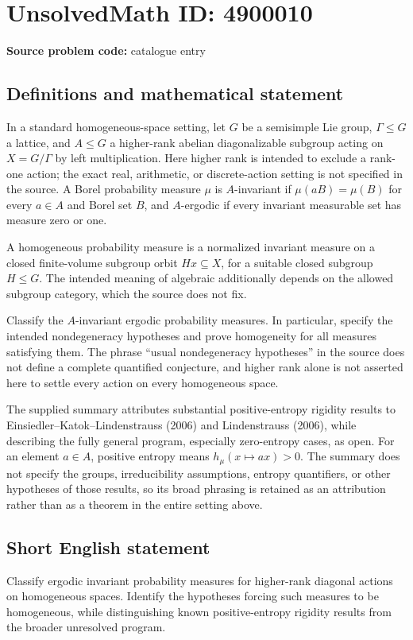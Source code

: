 \documentclass[11pt]{article}
\begin{document}
\section*{UnsolvedMath ID: 4900010}
\textbf{Source problem code:} catalogue entry
\subsection{Definitions and mathematical statement}
In a standard homogeneous-space setting, let $G$ be a semisimple Lie group, $\Gamma\leq G$ a lattice, and $A\leq G$ a higher-rank abelian diagonalizable subgroup acting on $X=G/\Gamma$ by left multiplication. Here higher rank is intended to exclude a rank-one action; the exact real, arithmetic, or discrete-action setting is not specified in the source. A Borel probability measure $\mu$ is $A$-invariant if $\mu(aB)=\mu(B)$ for every $a\in A$ and Borel set $B$, and $A$-ergodic if every invariant measurable set has measure zero or one.

A homogeneous probability measure is a normalized invariant measure on a closed finite-volume subgroup orbit $Hx\subseteq X$, for a suitable closed subgroup $H\leq G$. The intended meaning of algebraic additionally depends on the allowed subgroup category, which the source does not fix.

Classify the $A$-invariant ergodic probability measures. In particular, specify the intended nondegeneracy hypotheses and prove homogeneity for all measures satisfying them. The phrase ``usual nondegeneracy hypotheses'' in the source does not define a complete quantified conjecture, and higher rank alone is not asserted here to settle every action on every homogeneous space.

The supplied summary attributes substantial positive-entropy rigidity results to Einsiedler--Katok--Lindenstrauss (2006) and Lindenstrauss (2006), while describing the fully general program, especially zero-entropy cases, as open. For an element $a\in A$, positive entropy means $h_\mu(x\mapsto ax)>0$. The summary does not specify the groups, irreducibility assumptions, entropy quantifiers, or other hypotheses of those results, so its broad phrasing is retained as an attribution rather than as a theorem in the entire setting above.
\subsection{Short English statement}
Classify ergodic invariant probability measures for higher-rank diagonal actions on homogeneous spaces. Identify the hypotheses forcing such measures to be homogeneous, while distinguishing known positive-entropy rigidity results from the broader unresolved program.
\end{document}
